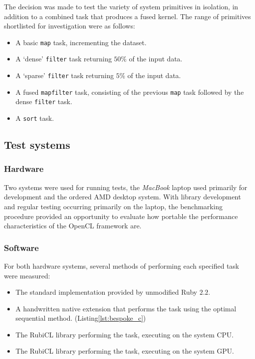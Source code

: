 The decision was made to test the variety of system primitives in isolation, in addition to a combined task that produces a fused kernel.
The range of primitives shortlisted for investigation were as follows:
\begin{itemize}
  \item A basic \verb|map| task, incrementing the dataset.
  \item A `dense' \verb|filter| task returning $50\%$ of the input data.
  \item A `sparse' \verb|filter| task returning $5\%$ of the input data.
  \item A fused \verb|mapfilter| task, consisting of the previous \verb|map| task followed by the dense \verb|filter| task.
  \item A \verb|sort| task.
\end{itemize}

\subsection{Test systems}
\subsubsection{Hardware}
Two systems were used for running tests, the \emph{MacBook} laptop used primarily for development and the ordered \ac{AMD} desktop system.
With library development and regular testing occurring primarily on the laptop, the benchmarking procedure provided an opportunity to evaluate how portable the performance characteristics of the \ac{OpenCL} framework are.

\subsubsection{Software}
For both hardware systems, several methods of performing each specified task were measured:
\begin{itemize}
    \item The standard implementation provided by unmodified Ruby $2.2$.
    \item A handwritten native extension that performs the task using the optimal sequential method. (Listing\ref{lst:bespoke_c})
    \item The RubiCL library performing the task, executing on the system \ac{CPU}.
    \item The RubiCL library performing the task, executing on the system \ac{GPU}.
\end{itemize}

